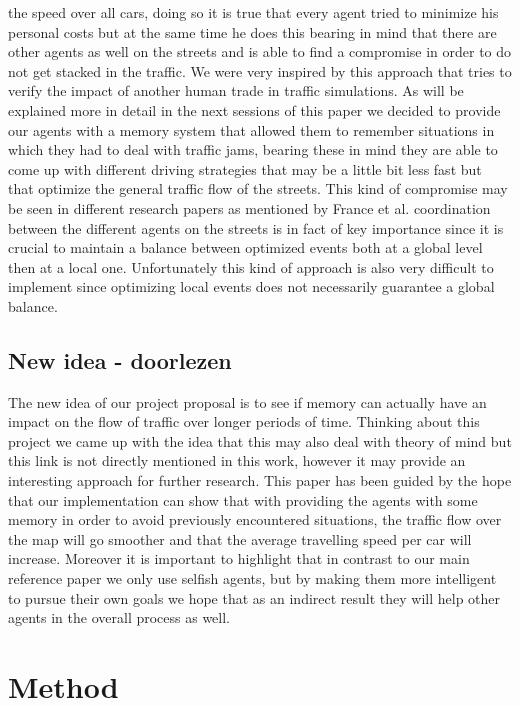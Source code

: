 \documentclass[a4paper,hidelinks]{article}
\begin{document}
the speed over all cars, doing so it is true that every agent tried to minimize his personal costs but at the same time he does this bearing in mind that there are other agents as well on the streets and is able to find a compromise in order to do not get stacked in the traffic. We were very inspired by this approach that tries to verify the impact of another human trade in traffic simulations. As will be explained more in detail in the next sessions of this paper we decided to provide our agents with a memory system that allowed them to remember situations in which they had to deal with traffic jams, bearing these in mind they are able to come up with different driving strategies that may be a little bit less fast but that optimize the general traffic flow of the streets.
This kind of compromise may be seen in different research papers as mentioned by France et al. \cite{france2003multiagent} coordination between the different agents on the streets is in fact of key importance since it is crucial to maintain a balance between optimized events both at a global level then at a local one. Unfortunately this kind of approach is also very difficult to implement since optimizing local events does not necessarily guarantee a global balance.         

\subsection{New idea - doorlezen}
The new idea of our project proposal is to see if memory can actually have an impact on the flow of traffic over longer periods of time. Thinking about this project we came up with the idea that this may also deal with theory of mind but this link is not directly mentioned in this work, however it may provide an interesting approach for further research. This paper has been guided by the hope that our implementation can show that with providing the agents with some memory in order to avoid previously encountered situations, the traffic flow over the map will go smoother and that the average travelling speed per car will increase. Moreover it is important to highlight that in contrast to our main reference paper \cite{gabel2012cooperative} we only use selfish agents, but by making them more intelligent to pursue their own goals we hope that as an indirect result they will help other agents in the overall process as well.

\section{Method}
\end{document}
